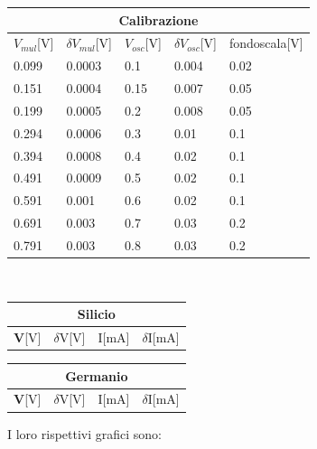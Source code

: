 \documentclass{amsart}
\begin{document}
    \begin{center}
        \begin{tabular}{|p{2cm}|p{2cm}|p{2cm}|p{2cm}|p{2cm}|}
            \hline
            \multicolumn{5}{|c|}{Calibrazione}\\
            \hline
            $V_{mul}$[V] & $\delta V_{mul}$[V] & $V_{osc}$[V] & $\delta V_{osc}$[V] & fondoscala[V]\\
            \hline
            0.099 & 0.0003 & 0.1 & 0.004 & 0.02\\
            0.151 & 0.0004 & 0.15 & 0.007 & 0.05\\
            0.199 & 0.0005 & 0.2 & 0.008 & 0.05\\
            0.294 & 0.0006 & 0.3 & 0.01 & 0.1\\
            0.394 & 0.0008 & 0.4 & 0.02 & 0.1\\
            0.491 & 0.0009 & 0.5 & 0.02 & 0.1\\
            0.591 & 0.001 & 0.6 & 0.02 & 0.1\\
            0.691 & 0.003 & 0.7 & 0.03 & 0.2\\
            0.791 & 0.003 & 0.8 & 0.03 & 0.2\\
            \hline
        \end{tabular}\\
        \vspace{0.2cm}
        \begin{tabular}{|p{1cm}|p{1cm}|p{1cm}|p{1cm}|}
            \hline
            \multicolumn{4}{|c|}{Silicio}\\
            \hline
            \textbf V[V] & $\delta$V[V] & I[mA] & $\delta$I[mA] \\
            \hline
            
            \hline      
        \end{tabular}
        \hspace{2cm}
        \begin{tabular}{|p{1cm}|p{1cm}|p{1cm}|p{1cm}|}
            \hline
            \multicolumn{4}{|c|}{Germanio}\\
            \hline
            \textbf V[V] & $\delta$V[V] & I[mA] & $\delta$I[mA] \\
            \hline
            
            \hline
        \end{tabular}
    \end{center}
    I loro rispettivi grafici sono:\\
    \hfill \\
\end{document}

